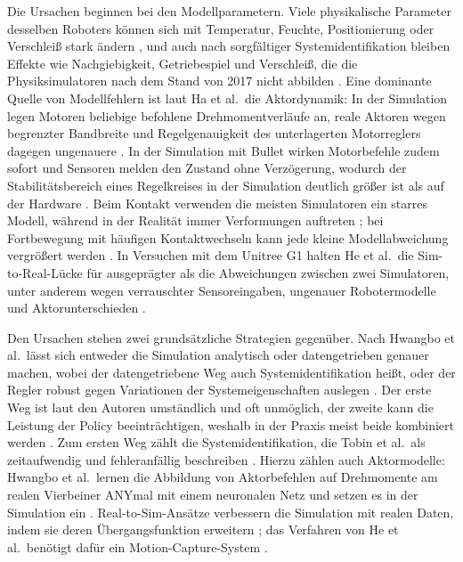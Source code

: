 Die Ursachen beginnen bei den Modellparametern.
Viele physikalische Parameter desselben Roboters können sich mit Temperatur, Feuchte, Positionierung oder Verschleiß stark ändern \cite{Zhao2020}, und auch nach sorgfältiger Systemidentifikation bleiben Effekte wie Nachgiebigkeit, Getriebespiel und Verschleiß, die die Physiksimulatoren nach dem Stand von 2017 nicht abbilden \cite{Tobin2017}.
Eine dominante Quelle von Modellfehlern ist laut Ha et al.\ die Aktordynamik: In der Simulation legen Motoren beliebige befohlene Drehmomentverläufe an, reale Aktoren wegen begrenzter Bandbreite und Regelgenauigkeit des unterlagerten Motorreglers dagegen ungenauere \cite{Ha2025}.
In der Simulation mit Bullet wirken Motorbefehle zudem sofort und Sensoren melden den Zustand ohne Verzögerung, wodurch der Stabilitätsbereich eines Regelkreises in der Simulation deutlich größer ist als auf der Hardware \cite{Tan2018}.
Beim Kontakt verwenden die meisten Simulatoren ein starres Modell, während in der Realität immer Verformungen auftreten \cite{Ha2025}; bei Fortbewegung mit häufigen Kontaktwechseln kann jede kleine Modellabweichung vergrößert werden \cite{Tan2018}.
In Versuchen mit dem Unitree G1 halten He et al.\ die Sim-to-Real-Lücke für ausgeprägter als die Abweichungen zwischen zwei Simulatoren, unter anderem wegen verrauschter Sensoreingaben, ungenauer Robotermodelle und Aktorunterschieden \cite{He2025}.

Den Ursachen stehen zwei grundsätzliche Strategien gegenüber.
Nach Hwangbo et al.\ lässt sich entweder die Simulation analytisch oder datengetrieben genauer machen, wobei der datengetriebene Weg auch Systemidentifikation heißt, oder der Regler robust gegen Variationen der Systemeigenschaften auslegen \cite{Hwangbo2019}.
Der erste Weg ist laut den Autoren umständlich und oft unmöglich, der zweite kann die Leistung der Policy beeinträchtigen, weshalb in der Praxis meist beide kombiniert werden \cite{Hwangbo2019}.
Zum ersten Weg zählt die Systemidentifikation, die Tobin et al.\ als zeitaufwendig und fehleranfällig beschreiben \cite{Tobin2017}.
Hierzu zählen auch Aktormodelle: Hwangbo et al.\ lernen die Abbildung von Aktorbefehlen auf Drehmomente am realen Vierbeiner ANYmal mit einem neuronalen Netz und setzen es in der Simulation ein \cite{Hwangbo2019}.
Real-to-Sim-Ansätze verbessern die Simulation mit realen Daten, indem sie deren Übergangsfunktion erweitern \cite{Ha2025}; das Verfahren von He et al.\ benötigt dafür ein Motion-Capture-System \cite{He2025}.

